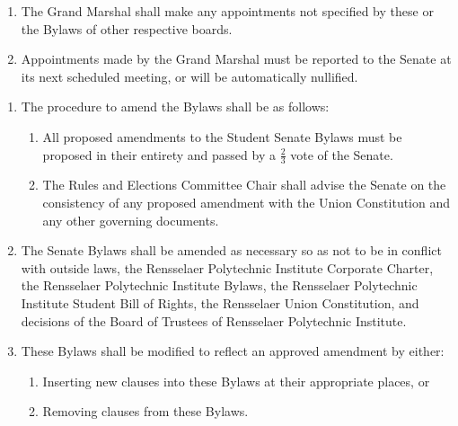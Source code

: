 \documentclass{bylaws}
\begin{document}
\begin{enumerate}
\item The Grand Marshal shall make any appointments not specified by these or the Bylaws of other respective boards.
\item Appointments made by the Grand Marshal must be reported to the Senate at its next scheduled meeting, or will be automatically nullified.
\end{enumerate}


\begin{enumerate}
\item The procedure to amend the Bylaws shall be as follows:
\begin{enumerate}
\item All proposed amendments to the Student Senate Bylaws must be proposed in their entirety and passed by a $\frac{2}{3}$ vote of the
Senate.
\item The Rules and Elections Committee Chair shall advise the Senate on the consistency of any proposed amendment with the
Union Constitution and any other governing documents.
\end{enumerate}

\item The Senate Bylaws shall be amended as necessary so as not to be in conflict with outside laws, the Rensselaer Polytechnic
Institute Corporate Charter, the Rensselaer Polytechnic Institute Bylaws, the Rensselaer Polytechnic Institute Student Bill of
Rights, the Rensselaer Union Constitution, and decisions of the Board of Trustees of Rensselaer Polytechnic Institute.

\item These Bylaws shall be modified to reflect an approved amendment by either:
\begin{enumerate}
\item Inserting new clauses into these Bylaws at their appropriate places, or
\item Removing clauses from these Bylaws.
\end{enumerate}
\end{enumerate}
\end{document}
